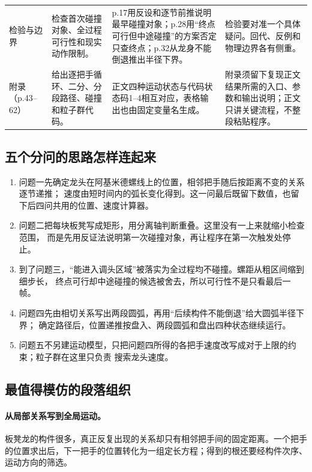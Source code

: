 \documentclass[UTF8,zihao=-4]{ctexart}
\begin{document}
\begin{longtable}{p{2.25cm}p{4.0cm}p{5.1cm}p{4.2cm}}
检验与边界
& 检查首次碰撞对象、全过程可行性和现实动作限制。
& p.17用反设和逐节前推说明最早碰撞对象；p.28用“终点可行但中途碰撞”的方案否定只查终点；p.32从龙身不能倒退推出半径下界。
& 检验要对准一个具体疑问。回代、反例和物理边界各有侧重。\\

附录（p.43--62）
& 给出逐把手循环、二分、分段路径、碰撞和粒子群代码。
& 正文四种运动状态与代码状态码1--4相互对应，表格输出也由固定变量名生成。
& 附录须留下复现正文结果所需的入口、参数和输出说明；正文只讲关键流程，不整段粘贴程序。\\
\end{longtable}
\normalsize

\subsection{五个分问的思路怎样连起来}

\begin{enumerate}
  \item 问题一先确定龙头在阿基米德螺线上的位置，相邻把手随后按距离不变的关系逐节递推；
  速度由短时间内的弧长变化得到。这一问最后既留下数值，也留下后四问共用的位置、速度计算器。
  \item 问题二把每块板凳写成矩形，用分离轴判断重叠。这里没有一上来就缩小检查范围，
  而是先用反证法说明第一次碰撞对象，再让程序在第一次触发处停止。
  \item 到了问题三，“能进入调头区域”被落实为全过程均不碰撞。螺距从粗区间缩到细步长，
  终点可行却中途碰撞的候选被舍去，所以可行性不是只看最后一帧。
  \item 问题四先由相切关系写出两段圆弧，再用“后续构件不能倒退”给大圆弧半径下界；
  确定路径后，位置递推按盘入、两段圆弧和盘出四种状态继续运行。
  \item 问题五不另建运动模型，只把问题四所得的各把手速度改写成对于上限的约束；粒子群在这里只负责
  搜索龙头速度。
\end{enumerate}

\subsection{最值得模仿的段落组织}

\paragraph{从局部关系写到全局运动。}
板凳龙的构件很多，真正反复出现的关系却只有相邻把手间的固定距离。一个把手的位置求出后，下一把手的位置转化为一组定长方程；得到的根还要经构件次序、运动方向的筛选。
\end{document}
